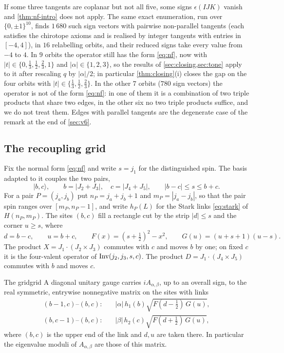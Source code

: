\begin{remark}\label{rem:nongeneric}
If some three tangents are coplanar but not all five, some signs $\epsilon(IJK)$ vanish
and \cref{thm:nf-intro} does not apply. The same exact enumeration, run over
$\{0,\pm1\}^{10}$, finds $1\,680$ such sign vectors with pairwise non-parallel tangents
(each satisfies the chirotope axioms and is realised by integer tangents with entries in
$[-4,4]$), in $16$ relabelling orbits, and their reduced signs take every value from $-4$
to $4$. In $9$ orbits the operator still has the form \eqref{eq:nf}, now with
$|t|\in\{0,\frac13,\frac12,\frac23,1\}$ and $|\alpha|\in\{1,2,3\}$, so the results of
\cref{sec:closing,sec:tone} apply to it after rescaling $q$ by $|\alpha|/2$; in particular
\cref{thm:closing}(i) closes the gap on the four orbits with $|t|\in\{\frac13,\frac12,\frac23\}$.
In the other $7$ orbits ($780$ sign vectors) the operator is not of the form
\eqref{eq:nf}: in one of them it is a combination of two triple products that share two
edges, in the other six no two triple products suffice, and we do not treat them. Edges with parallel tangents are
the degenerate case of the remark at the end of \cref{sec:v6}.
\end{remark}

\subsection{The recoupling grid}

Fix the normal form \eqref{eq:nf} and write $s=j_1$ for the distinguished spin. The
basis adapted to it couples the two pairs,
\[
  |b,c\rangle,\qquad b=|J_2+J_3|,\quad c=|J_4+J_5|,\qquad |b-c|\le s\le b+c .
\]
For a pair $P=(j_a,j_b)$ put $n_P=j_a+j_b+1$ and $m_P=|j_a-j_b|$, so that the pair
spin ranges over $[m_P,n_P-1]$, and write $h_P(L)$ for the Stark links
\eqref{eq:stark} of $H(n_P,m_P)$. The sites $(b,c)$ fill a rectangle cut by the
strip $|d|\le s$ and the corner $u\ge s$, where
\[
  d=b-c,\qquad u=b+c,\qquad F(x)=(s+\tfrac12)^2-x^2,\qquad G(u)=(u+s+1)(u-s).
\]
The product $X=J_1\cdot(J_2\times J_3)$ commutes with $c$ and moves $b$ by one; on
fixed $c$ it is the four-valent operator of $\operatorname{Inv}(j_2,j_3,s,c)$. The product
$D=J_1\cdot(J_4\times J_5)$ commutes with $b$ and moves $c$.

\begin{proposition}{The grid}{grid}
A diagonal unitary gauge carries $iA_{\alpha,\beta}$, up to an overall sign, to the real
symmetric, entrywise nonnegative matrix on the sites with links
\begin{align*}
  (b-1,c)\text{--}(b,c):\quad &|\alpha|\,h_1(b)\sqrt{F(d-\tfrac12)\,G(u)},\\
  (b,c-1)\text{--}(b,c):\quad &|\beta|\,h_2(c)\sqrt{F(d+\tfrac12)\,G(u)},
\end{align*}
where $(b,c)$ is the upper end of the link and $d,u$ are taken there. In particular the
eigenvalue moduli of $A_{\alpha,\beta}$ are those of this matrix.
\end{proposition}

